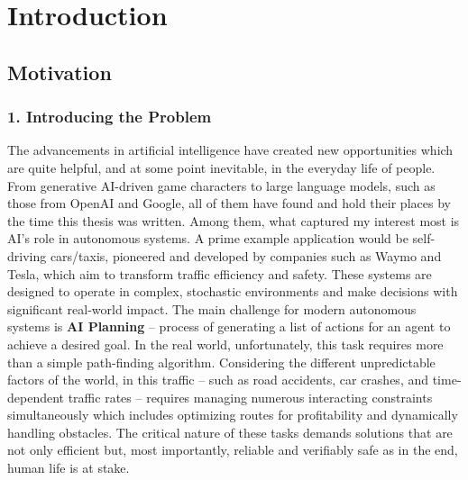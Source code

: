\documentclass[12pt, a4paper, oneside]{report} %
\begin{document}
\clearpage
\chapter{Introduction}

\label{chap:introduction}

\section{Motivation}

\subsection*{1. Introducing the Problem}
The advancements in artificial intelligence have created new opportunities which are quite helpful, and at some point inevitable, in the everyday life of people. From generative AI-driven game characters to large language models, such as those from OpenAI and Google, all of them have found and hold their places by the time this thesis was written. Among them, what captured my interest most is AI's role in autonomous systems. A prime example application would be self-driving cars/taxis, pioneered and developed by companies such as Waymo and Tesla, which aim to transform traffic efficiency and safety. These systems are designed to operate in complex, stochastic environments and make decisions with significant real-world impact. The main challenge for modern autonomous systems is  \textbf{AI Planning} -- process of generating a list of actions for an agent to achieve a desired goal. In the real world, unfortunately, this task requires more than a simple path-finding algorithm. Considering the different unpredictable factors of the world, in this  traffic -- such as road accidents, car crashes, and time-dependent traffic rates -- requires managing numerous interacting constraints simultaneously which includes optimizing routes for profitability and dynamically handling obstacles. The critical nature of these tasks demands solutions that are not only efficient but, most importantly, reliable and verifiably safe as in the end, human life is at stake.
\end{document}
